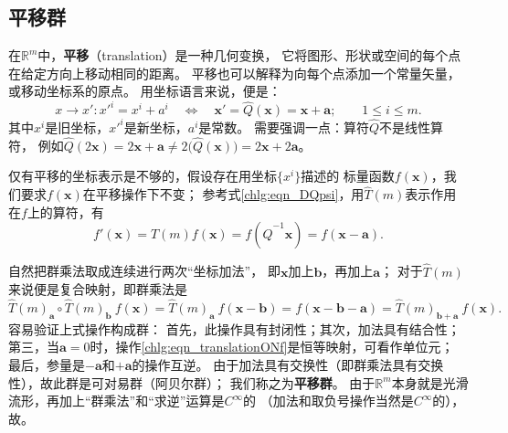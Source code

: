 
\subsection{平移群}\label{chlg:sec_translation-group}
在$\mathbb{R}^m$中，\textbf{平移}（translation）是一种几何变换，
它将图形、形状或空间的每个点在给定方向上移动相同的距离。
平移也可以解释为向每个点添加一个常量矢量，或移动坐标系的原点。
用坐标语言来说，便是：
\begin{equation}\label{chlg:eqn_translation}
    x\to x' : x'^{i} = x^i + a^i 
    \quad \Leftrightarrow \quad
    \boldsymbol{x}' =\hat{Q}(\boldsymbol{x})= \boldsymbol{x} + \boldsymbol{a} ;
    \qquad 1 \leqslant i \leqslant m .
\end{equation}
其中$x^i$是旧坐标，$x'^i$是新坐标，$a^i$是常数。
需要强调一点：算符$\hat{Q}$不是线性算符，
例如$\hat{Q} (2 \boldsymbol{x}) =2 \boldsymbol{x} + \boldsymbol{a} \neq 
2\bigl(\hat{Q}(\boldsymbol{x})\bigr)=2 \boldsymbol{x} + 2\boldsymbol{a}$。

仅有平移的坐标表示是不够的，假设存在用坐标$\{x^i\}$描述的
标量函数$f(\boldsymbol{x})$，我们要求$f(\boldsymbol{x})$在平移操作下不变；
参考式\eqref{chlg:eqn_DQpsi}，用$\hat{T}(m)$表示作用在$f$上的算符，有
\begin{equation}\label{chlg:eqn_translationONf}
    f'(\boldsymbol{x})=\hat{T}(m) f(\boldsymbol{x})= f(\hat{Q}^{-1}\boldsymbol{x}) = f(\boldsymbol{x} - \boldsymbol{a}) .
\end{equation}


自然把群乘法取成连续进行两次“坐标加法”，
即$\boldsymbol{x}$加上$\boldsymbol{b}$，再加上$\boldsymbol{a}$；
对于$\hat{T}(m)$来说便是复合映射，即群乘法是
\begin{equation*}
    \hat{T}(m)_{\boldsymbol{a}}\circ \hat{T}(m)_{\boldsymbol{b}}\ f(\boldsymbol{x}) 
    = \hat{T}(m)_{\boldsymbol{a}}\ f(\boldsymbol{x} - \boldsymbol{b}) 
    = f(\boldsymbol{x} - \boldsymbol{b} - \boldsymbol{a}) 
    = \hat{T}(m)_{\boldsymbol{b}+ \boldsymbol{a}}\ f(\boldsymbol{x}) .
\end{equation*}
容易验证上式操作构成群：
首先，此操作具有封闭性；其次，加法具有结合性；
第三，当$\boldsymbol{a}=0$时，操作\eqref{chlg:eqn_translationONf}是恒等映射，可看作单位元；
最后，参量是$-\boldsymbol{a}$和$+\boldsymbol{a}$的操作互逆。
由于加法具有交换性（即群乘法具有交换性），故此群是可对易群（阿贝尔群）；
我们称之为\textbf{平移群}。
由于$\mathbb{R}^m$本身就是光滑流形，再加上“群乘法”和“求逆”运算是$C^\infty$的
（加法和取负号操作当然是$C^\infty$的），故。

